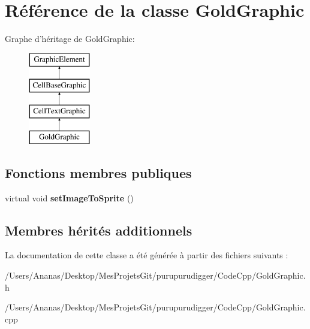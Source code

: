 \hypertarget{class_gold_graphic}{\section{Référence de la classe Gold\-Graphic}
\label{class_gold_graphic}
}
Graphe d'héritage de Gold\-Graphic\-:\begin{figure}[H]
\begin{center}
\leavevmode
\includegraphics[height=4.000000cm]{class_gold_graphic}
\end{center}
\end{figure}
\subsection*{Fonctions membres publiques}
\begin{DoxyCompactItemize}
\item 
\hypertarget{class_gold_graphic_a6375496c97a1dd0e0b2d9241add4167c}{virtual void {\bfseries set\-Image\-To\-Sprite} ()}\label{class_gold_graphic_a6375496c97a1dd0e0b2d9241add4167c}

\end{DoxyCompactItemize}
\subsection*{Membres hérités additionnels}


La documentation de cette classe a été générée à partir des fichiers suivants \-:\begin{DoxyCompactItemize}
\item 
/\-Users/\-Ananas/\-Desktop/\-Mes\-Projets\-Git/purupurudigger/\-Code\-Cpp/Gold\-Graphic.\-h\item 
/\-Users/\-Ananas/\-Desktop/\-Mes\-Projets\-Git/purupurudigger/\-Code\-Cpp/Gold\-Graphic.\-cpp\end{DoxyCompactItemize}

